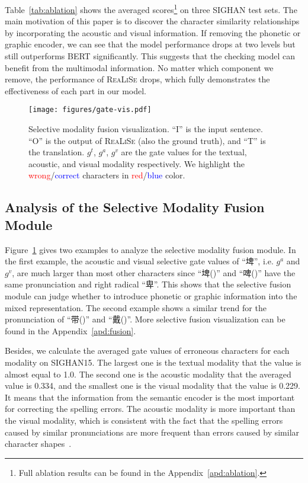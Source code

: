 \documentclass[11pt,a4paper]{article}
\newcommand\model{\textsc{ReaLiSe}}
\begin{document}
Table~\ref{tab:ablation} shows the averaged scores\footnote{Full ablation results can be found in the Appendix~\ref{apd:ablation}.} on three SIGHAN test sets. 
The main motivation of this paper is to discover the character similarity relationships by incorporating the acoustic and visual information. If removing the phonetic or graphic encoder, we can see that the model performance drops at two levels but still outperforms BERT significantly. This suggests that the checking model can benefit from the multimodal information.
No matter which component we remove, the performance of \model{} drops, which fully demonstrates the effectiveness of each part in our model. 


\begin{figure}[t]
    \centering
    \texttt{[image: figures/gate-vis.pdf]}
    \caption{Selective modality fusion visualization. ``I'' is the input sentence. ``O'' is the output of \model{} (also the ground truth), and ``T'' is the translation. $g^t$, $g^a$, $g^v$ are the gate values for the textual, acoustic, and visual modality respectively. We highlight the \textcolor{red}{wrong}/\textcolor{blue}{correct} characters in \textcolor{red}{red}/\textcolor{blue}{blue} color.}
    \label{fig:gate-vis}
\end{figure}


\subsection{Analysis of the Selective Modality Fusion Module}

\begin{CJK*}{UTF8}{gbsn}


Figure~\ref{fig:gate-vis} gives two examples to analyze the selective modality fusion module. 
In the first example, the acoustic and visual selective gate values of ``埤'', i.e. $g^a$ and $g^v$, are much larger than most other characters since ``埤()'' and ``啤()'' have the same pronunciation and right radical ``卑''.
This shows that the selective fusion module can judge whether to introduce phonetic or graphic information into the mixed representation.
The second example shows a similar trend for the pronunciation of ``带()'' and ``戴()''.
More selective fusion visualization can be found in the Appendix~\ref{apd:fusion}.

Besides, we calculate the averaged gate values of erroneous characters for each modality on SIGHAN15.
The largest one is the textual modality that the value is almost equal to 1.0.
The second one is the acoustic modality that the averaged value is 0.334, and the smallest one is the visual modality that the value is 0.229.
It means that the information from the semantic encoder is the most important for correcting the spelling errors. The acoustic modality is more important than the visual modality, which is consistent with the fact that the spelling errors caused by similar pronunciations are more frequent than errors caused by similar character shapes~\citep{vis-pho-ratio}.


\end{CJK*}
\end{document}
